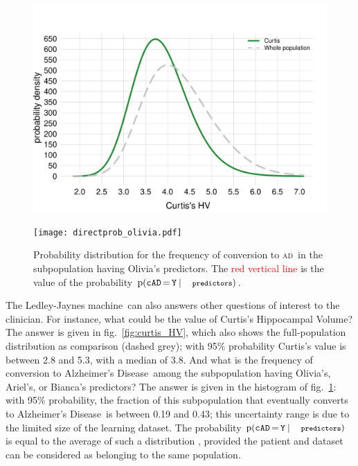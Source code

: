 \documentclass[utf8]{FrontiersinHarvard_mod} %
\newcommand*{\mo}[1][=]{\mathord{\,#1\,}}
\newcommand*{\sects}{\S\S}%
\newcommand*{\fig}{fig.}%
\newcommand*{\eg}{{e.g.}}
\newcommand*{\p}{\mathrm{p}}%
\renewcommand*{\|}[1][]{\nonscript\:#1\vert\nonscript\:\mathopen{}}
\newcommand*{\cad}{\texttt{cAD}}
\newcommand*{\yes}{\texttt{Y}}
\newcommand*{\predictors}{\texttt{\footnotesize predictors}}
\newcommand*{\ad}{Alzheimer's Disease}
\newcommand*{\ljm}{Ledley-Jaynes machine}
\newcommand*{\AD}{\textsc{ad}}
\begin{document}
  

\begin{subfigure}[t]\setcounter{subfigure}{0}
  \centering%
  \begin{minipage}[t]{0.49\linewidth}\centering
    \includegraphics[width=\linewidth]{curtis_distr_HV.pdf}
    \caption{Probability distribution for Curtis's Hippocampal Volume (\textcolor{green}{green}). The full-population distribution (\textcolor{grey}{dashed grey}) is also plotted for reference.}\label{fig:curtis_HV}
  \end{minipage}\hfill%
  \begin{minipage}[t]{0.49\linewidth}\centering
    \texttt{[image: directprob\_olivia.pdf]}
    \caption{Probability distribution for the frequency of conversion to \AD\ in the subpopulation having Olivia's predictors. The \textcolor{red}{red vertical line} is the value of the probability $\p(\cad\mo\yes \| \predictors)$.}\label{fig:freq_distribution_patients}
  \end{minipage}
\end{subfigure}%
The \ljm\ can also answers other questions of interest to the clinician. For instance, what could be the value of Curtis's Hippocampal Volume? The answer is given in \fig~\ref{fig:curtis_HV}, which also shows the full-population distribution as comparison (dashed grey); with 95\% probability Curtis's value is between 2.8 and 5.3, with a median of 3.8. And what is the frequency of conversion to \ad\ among the subpopulation having Olivia's, Ariel's, or Bianca's predictors? The answer is given in the histogram of \fig~\ref{fig:freq_distribution_patients}: with 95\% probability, the fraction of this subpopulation that eventually converts to \ad\ is between 0.19 and 0.43; this uncertainty range is due to the limited size of the learning dataset. The probability $\p(\cad\mo\yes \| \predictors)$ is equal to the average of such a distribution \citep[\eg][\sects~4.2--4.3]{bernardoetal1994_r2000}, provided the patient and dataset can be considered as belonging to the same population.
\end{document}
